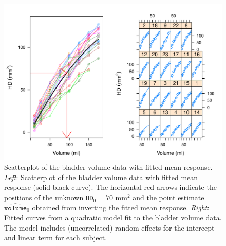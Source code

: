 \documentclass[cmfont,usenames,dvipsnames,leqno]{afit-etd}\usepackage[]{graphicx}\usepackage[]{color}
\makeatletter
\def\maxwidth{ %
  \ifdim\Gin@nat@width>\linewidth
    \linewidth
  \else
    \Gin@nat@width
  \fi
}
\newenvironment{knitrout}{}{} %
\renewenvironment{knitrout}{\begin{singlespace}}{\end{singlespace}}
\newcommand{\wh}[1]{\ensuremath{\widehat{#1}}}
\makeatother
\begin{document}
\begin{knitrout}
\color{fgcolor}\begin{figure}[H]

\includegraphics[width=\maxwidth]{figure/bladder-fit} \caption[Scatterplot of the bladder volume data with fitted mean response]{Scatterplot of the bladder volume data with fitted mean response. \textit{Left}: Scatterplot of the bladder volume data with fitted mean response (solid black curve). The horizontal red arrows indicate the positions of the unknown $\texttt{HD}_0 = 70 \text{ mm}^2$ and the point estimate $\wh{\texttt{volume}}_0$ obtained from inverting the fitted mean response. \textit{Right}: Fitted curves from a quadratic model fit to the bladder volume data. The model includes (uncorrelated) random effects for the intercept and linear term for each subject.\label{fig:bladder-fit}}
\end{figure}


\end{knitrout}
\end{document}
